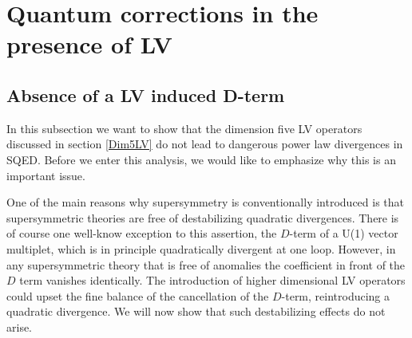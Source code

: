\documentclass[12pt]{revtex4}
\begin{document}
\section{Quantum corrections in the presence of LV}
\label{quantum}




\subsection{Absence of a LV induced D-term}
\label{noDterm}


In this subsection we want to show that the dimension five LV operators
discussed in section \ref{Dim5LV} do not lead to dangerous power 
law divergences in SQED. Before we enter this analysis, we would like
to emphasize why this is an important issue. 

One of the main reasons
why supersymmetry is conventionally introduced is that 
supersymmetric theories are free of destabilizing quadratic
divergences. There is of course one well-know 
exception to this assertion, the $D$-term of a U(1) vector multiplet,
which is in principle quadratically divergent at one loop. 
However, in any supersymmetric theory that is free of anomalies the
coefficient in front of the $D$ term vanishes identically. The
introduction of higher dimensional LV operators could upset the fine
balance of the cancellation of the $D$-term, reintroducing a quadratic
divergence. We will now show that such destabilizing effects do not
arise. 
\end{document}
